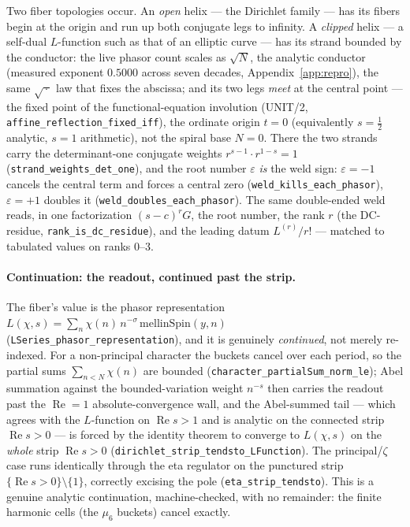 \documentclass[11pt]{article}
\theoremstyle{definition}
\renewcommand{\Re}{\operatorname{Re}}
\begin{document}
Two fiber topologies occur. An \emph{open} helix --- the Dirichlet family --- has its fibers begin at
the origin and run up both conjugate legs to infinity. A \emph{clipped} helix --- a self-dual
$L$-function such as that of an elliptic curve --- has its strand bounded by the conductor: the live
phasor count scales as $\sqrt N$, the analytic conductor (measured exponent $0.5000$ across seven
decades, Appendix~\ref{app:repro}), the same $\sqrt{\,\cdot\,}$ law that fixes the abscissa; and its
two legs \emph{meet} at the central point --- the fixed point of the functional-equation involution
(UNIT/2, \texttt{affine\_reflection\_fixed\_iff}), the ordinate origin $t=0$ (equivalently
$s=\tfrac12$ analytic, $s=1$ arithmetic), not the spiral base $N=0$. There the two strands carry the
determinant-one conjugate weights $r^{s-1}\!\cdot r^{1-s}=1$ (\texttt{strand\_weights\_det\_one}), and
the root number $\varepsilon$ \emph{is} the weld sign: $\varepsilon=-1$ cancels the central term and
forces a central zero (\texttt{weld\_kills\_each\_phasor}), $\varepsilon=+1$ doubles it
(\texttt{weld\_doubles\_each\_phasor}). The same double-ended weld reads, in one factorization
$(s-c)^r G$, the root number, the rank $r$ (the DC-residue, \texttt{rank\_is\_dc\_residue}), and the
leading datum $L^{(r)}/r!$ --- matched to tabulated values on ranks $0$–$3$.

\paragraph{Continuation: the readout, continued past the strip.} The fiber's value is the phasor
representation $L(\chi,s)=\sum_n\chi(n)\,n^{-\sigma}\,\mathrm{mellinSpin}(y,n)$
(\texttt{LSeries\_phasor\_representation}), and it is genuinely \emph{continued}, not merely
re-indexed. For a non-principal character the buckets cancel over each period, so the partial sums
$\sum_{n<N}\chi(n)$ are bounded (\texttt{character\_partialSum\_norm\_le}); Abel summation against the
bounded-variation weight $n^{-s}$ then carries the readout past the $\Re=1$ absolute-convergence wall,
and the Abel-summed tail --- which agrees with the $L$-function on $\Re s>1$ and is analytic on the
connected strip $\Re s>0$ --- is forced by the identity theorem to converge to $L(\chi,s)$ on the
\emph{whole} strip $\Re s>0$ (\texttt{dirichlet\_strip\_tendsto\_LFunction}). The principal/$\zeta$
case runs identically through the eta regulator on the punctured strip $\{\Re s>0\}\setminus\{1\}$,
correctly excising the pole (\texttt{eta\_strip\_tendsto}). This is a genuine analytic continuation,
machine-checked, with no remainder: the finite harmonic cells (the $\mu_6$ buckets) cancel exactly.
\end{document}
